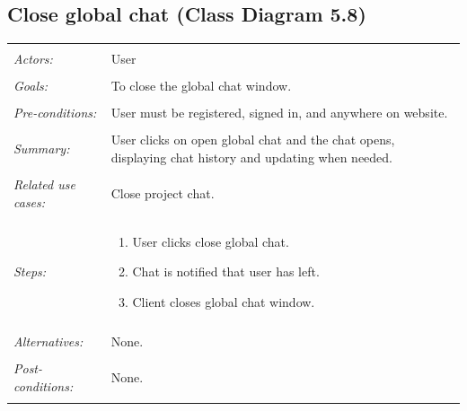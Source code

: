 \documentclass[11pt]{report}
\begin{document}
\subsection{Close global chat (Class Diagram 5.8)}
\begin{tabular}{ p{2cm} p{12cm} }
 \hline
 \\
 \textit{Actors:} & User \\ 
 \\
 \textit{Goals:} & To close the global chat window. \\
 \\
 \textit{Pre-conditions:} & User must be registered, signed in, and anywhere on website.  \\
 \\
 \textit{Summary:} & User clicks on open global chat and the chat opens, displaying chat history and updating when needed. \\ 
 \\
 \textit{Related use cases:} & Close project chat. \\ 
 \\
 \textit{Steps:} & \begin{enumerate}
  \item User clicks close global chat.
  \item Chat is notified that user has left.
  \item Client closes global chat window.
 \end{enumerate} \\
 \\
 \textit{Alternatives:} & None. \\
 \\
 \textit{Post-conditions:} & None. \\
 \\
\hline
\end{tabular}
\end{document}
